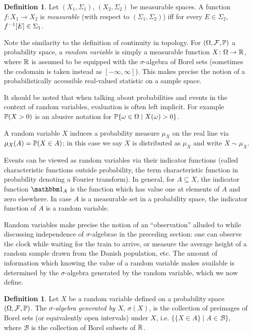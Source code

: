 \documentclass{article}
\theoremstyle{definition}
\newtheorem{definition}[theorem]{Definition}
\newcommand{\bldset}[2]{\{{#1}\mid{#2}\}}
\begin{document}
\begin{definition}
Let $(X_1, \Sigma_1)$, $(X_2, \Sigma_2)$ be measurable spaces. A function $f\colon X_1 \rightarrow X_2$ is {\em measurable} (with respect to $(\Sigma_1, \Sigma_2)$) iff for every $E \in \Sigma_2$, $f\inv[E] \in \Sigma_1$.
\end{definition}

Note the similarity to the definition of continuity in topology. For $(\Omega, \mathcal F, \P)$ a probability space, a {\em random variable} is simply a measurable function $X\colon \Omega \rightarrow \R$, where $\R$ is assumed to be equipped with the $\sigma$-algebra of Borel sets (sometimes the codomain is taken instead as $[-\infty, \infty]$). This makes precise the notion of a probabilistically accessible real-valued statistic on a sample space.

It should be noted that when talking about probabilities and events in the context of random variables, evaluation is often left implicit. For example $\P(X > 0)$ is an abusive notation for $\P\bldset{\omega \in \Omega}{X(\omega) > 0}$.

A random variable $X$ induces a probability measure $\mu_X$ on the real line via $\mu_X (A) = \P(X \in A)$; in this case we say $X$ is distributed as $\mu_X$ and write $X \sim \mu_X$.

Events can be viewed as random variables via their indicator functions (called characteristic functions outside probability, the term characteristic function in probability denoting a Fourier transform). In general, for $A \subseteq X$, the indicator function $\mathbbm 1_A$ is the function which has value one at elements of $A$ and zero elsewhere. In case $A$ is a measurable set in a probability space, the indicator function of $A$ is a random variable.

Random variables make precise the notion of an ``observation'' alluded to while discussing independence of $\sigma$-algebrae in the preceding section: one can observe the clock while waiting for the train to arrive, or measure the average height of a random sample drawn from the Danish population, etc. The amount of information which knowing the value of a random variable makes available is determined by the $\sigma$-algebra generated by the random variable, which we now define.

\begin{definition}
Let $X$ be a random variable defined on a probability space $(\Omega, \mathcal F, \P)$. The {\em $\sigma$-algebra generated by $X$}, $\sigma(X)$, is the collection of preimages of Borel sets (or equivalently open intervals) under $X$, i.e. $\bldset{\{X \in A\}}{A \in \mathcal B}$, where $\mathcal B$ is the collection of Borel subsets of $\R$.
\end{definition}
\end{document}

